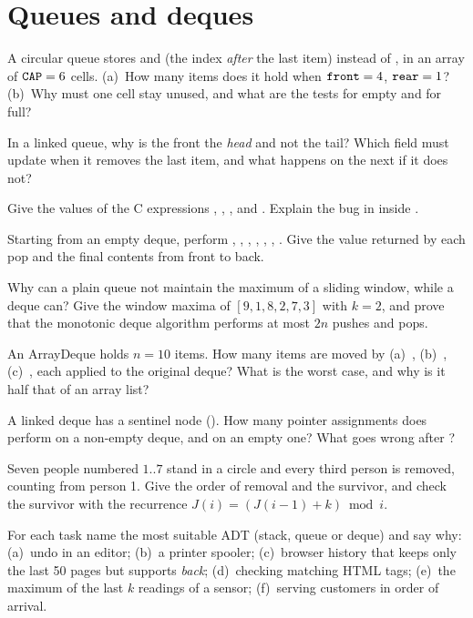 \section*{Queues and deques}
\begin{questions}[resume]
\item A circular queue stores  and  (the index \emph{after} the last
  item) instead of , in an array of $\texttt{CAP}=6$ cells. (a)~How many items does
  it hold when $\texttt{front}=4$, $\texttt{rear}=1$? (b)~Why must one cell stay unused, and what
  are the tests for empty and for full?
\item In a linked queue, why is the front the \emph{head} and not the tail? Which field
  must  update when it removes the last item, and what happens on the next
   if it does not?
\item Give the values of the C expressions , , ,
   and . Explain the bug in
   inside .
\item Starting from an empty deque, perform , ,
  , , , ,
  . Give the value returned by each pop and the final contents from front
  to back.
\item Why can a plain queue not maintain the maximum of a sliding window, while a deque
  can? Give the window maxima of $[9,1,8,2,7,3]$ with $k=2$, and prove that the monotonic
  deque algorithm performs at most $2n$ pushes and pops.
\item An ArrayDeque holds $n=10$ items. How many items are moved by (a)~,
  (b)~, (c)~, each applied to the original deque? What is the
  worst case, and why is it half that of an array list?
\item A linked deque has a sentinel node (). How many pointer assignments does  perform on a
  non-empty deque, and on an empty one? What goes wrong after ?
\item Seven people numbered $1..7$ stand in a circle and every third person is removed,
  counting from person 1. Give the order of removal and the survivor, and check the
  survivor with the recurrence $J(i)=(J(i-1)+k)\bmod i$.
\item For each task name the most suitable ADT (stack, queue or deque) and say why:
  (a)~undo in an editor; (b)~a printer spooler; (c)~browser history that keeps only the
  last 50 pages but supports \emph{back}; (d)~checking matching HTML tags; (e)~the
  maximum of the last $k$ readings of a sensor; (f)~serving customers in order of arrival.
\end{questions}

